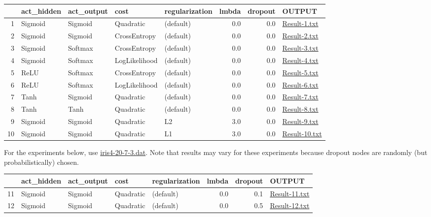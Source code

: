 \documentclass[11pt]{article}
\begin{document}
\begin{center}
\begin{tabular}{rllllrrl}
 & act\_hidden & act\_output & cost & regularization & lmbda & dropout & OUTPUT\\
\hline
1 & Sigmoid & Sigmoid & Quadratic & (default) & 0.0 & 0.0 & \href{./Result-1.txt}{Result-1.txt}\\
2 & Sigmoid & Sigmoid & CrossEntropy & (default) & 0.0 & 0.0 & \href{./Result-2.txt}{Result-2.txt}\\
3 & Sigmoid & Softmax & CrossEntropy & (default) & 0.0 & 0.0 & \href{./Result-3.txt}{Result-3.txt}\\
4 & Sigmoid & Softmax & LogLikelihood & (default) & 0.0 & 0.0 & \href{./Result-4.txt}{Result-4.txt}\\
5 & ReLU & Softmax & CrossEntropy & (default) & 0.0 & 0.0 & \href{./Result-5.txt}{Result-5.txt}\\
6 & ReLU & Softmax & LogLikelihood & (default) & 0.0 & 0.0 & \href{./Result-6.txt}{Result-6.txt}\\
7 & Tanh & Sigmoid & Quadratic & (default) & 0.0 & 0.0 & \href{./Result-7.txt}{Result-7.txt}\\
8 & Tanh & Tanh & Quadratic & (default) & 0.0 & 0.0 & \href{./Result-8.txt}{Result-8.txt}\\
9 & Sigmoid & Sigmoid & Quadratic & L2 & 3.0 & 0.0 & \href{./Result-9.txt}{Result-9.txt}\\
10 & Sigmoid & Sigmoid & Quadratic & L1 & 3.0 & 0.0 & \href{./Result-10.txt}{Result-10.txt}\\
\end{tabular}
\end{center}

For the experiments below, use \href{./iris4-20-7-3.dat}{iris4-20-7-3.dat}. Note that results may vary for these experiments because dropout nodes are randomly (but probabilistically) chosen.

\begin{center}
\begin{tabular}{rllllrrl}
 & act\_hidden & act\_output & cost & regularization & lmbda & dropout & OUTPUT\\
\hline
11 & Sigmoid & Sigmoid & Quadratic & (default) & 0.0 & 0.1 & \href{./Result-11.txt}{Result-11.txt}\\
12 & Sigmoid & Sigmoid & Quadratic & (default) & 0.0 & 0.5 & \href{./Result-12.txt}{Result-12.txt}\\
\end{tabular}
\end{center}
\end{document}
